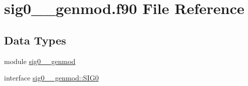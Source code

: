 \hypertarget{sig0____genmod_8f90}{\section{sig0\+\_\+\+\_\+genmod.\+f90 File Reference}
\label{sig0____genmod_8f90}
}
\subsection*{Data Types}
\begin{DoxyCompactItemize}
\item 
module \hyperlink{classsig0____genmod}{sig0\+\_\+\+\_\+genmod}
\item 
interface \hyperlink{interfacesig0____genmod_1_1SIG0}{sig0\+\_\+\+\_\+genmod\+::\+S\+I\+G0}
\end{DoxyCompactItemize}
